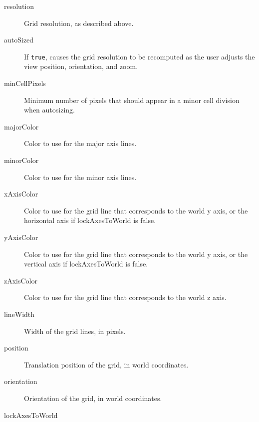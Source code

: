 \documentclass{article}
\begin{document}
\begin{description}

\item[resolution]\mbox{}

Grid resolution, as described above.

\item[autoSized]\mbox{}

If {\tt true}, causes the grid resolution to be recomputed as the user
adjusts the view position, orientation, and zoom.

\item[minCellPixels]\mbox{}

Minimum number of pixels that should appear in a minor cell division
when autosizing.

\item[majorColor]\mbox{}

Color to use for the major axis lines.

\item[minorColor]\mbox{}

Color to use for the minor axis lines.

\item[xAxisColor]\mbox{}

Color to use for the grid line that corresponds to the world y axis,
or the horizontal axis if {\sf lockAxesToWorld} is false.

\item[yAxisColor]\mbox{}

Color to use for the grid line that corresponds to the world y axis,
or the vertical axis if {\sf lockAxesToWorld} is false.

\item[zAxisColor]\mbox{}

Color to use for the grid line that corresponds to the world z
axis.

\item[lineWidth]\mbox{}

Width of the grid lines, in pixels.

\item[position]\mbox{}

Translation position of the grid, in world coordinates.

\item[orientation]\mbox{}

Orientation of the grid, in world coordinates.

\item[lockAxesToWorld]\mbox{}


\end{description}
\end{document}
